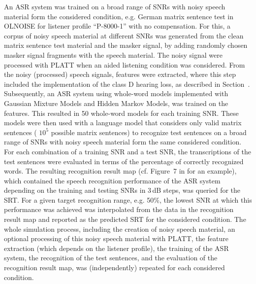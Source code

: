 \documentclass[10pt,a4paper,twocolumn]{article}
\begin{document}
An ASR system was trained on a broad range of SNRs with noisy speech material form the considered condition, e.g. German matrix sentence test in OLNOISE for listener profile \enquote{P-8000-1} with no compensation.
%
For this, a corpus of noisy speech material at different SNRs was generated from the clean matrix sentence test material and the masker signal, by adding randomly chosen masker signal fragments with the speech material.
%
The noisy signal were processed with PLATT when an aided listening condition was considered.
%
From the noisy (processed) speech signals, features were extracted, where this step included the implementation of the class D hearing loss, as described in Section~.
%
Subsequently, an ASR system using whole-word models implemented with Gaussian Mixture Models and Hidden Markov Models, was trained on the features.
%
This resulted in 50 whole-word models for each training SNR.
%
These models were then used with a language model that considers only valid matrix sentences ( $10^5$ possible matrix sentences) to recognize test sentences on a broad range of SNRs with noisy speech material form the same considered condition.
%
For each combination of a training SNR and a test SNR, the transcriptions of the test sentences were evaluated in terms of the percentage of correctly recognized words.
%
The resulting recognition result map (cf. Figure~7 in \cite{schaedler2020a} for an example), which contained the speech recognition performance of the ASR system depending on the training and testing SNRs in 3\,dB steps, was queried for the SRT.
%
For a given target recognition range, e.g. 50\%, the lowest SNR at which this performance was achieved was interpolated from the data in the recognition result map and reported as the predicted SRT for the considered condition.
%
The whole simulation process, including the creation of noisy speech material, an optional processing of this noisy speech material with PLATT, the feature extraction (which depends on the listener profile), the training of the ASR system, the recognition of the test sentences, and the evaluation of the recognition result map, was (independently) repeated for each considered condition.

\end{document}
